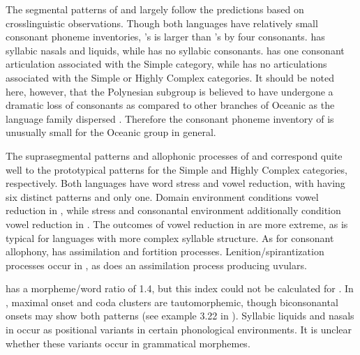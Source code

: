   The segmental patterns of  and  largely follow the predictions based on crosslinguistic observations. Though both languages have relatively small consonant phoneme inventories, ’s is larger than ’s by four consonants.  has syllabic nasals and liquids, while  has no syllabic consonants.  has one consonant articulation associated with the Simple category, while  has no articulations associated with the Simple or Highly Complex categories. It should be noted here, however, that the Polynesian subgroup is believed to have undergone a dramatic loss of consonants as compared to other branches of Oceanic as the language family dispersed \citep{Trudgill2004}. Therefore the consonant phoneme inventory of  is unusually small for the Oceanic group in general.

  The suprasegmental patterns and allophonic processes of  and  correspond quite well to the prototypical patterns for the Simple and Highly Complex categories, respectively. Both languages have word stress and vowel reduction, with  having six distinct patterns and  only one. Domain environment conditions vowel reduction in , while stress and consonantal environment additionally condition vowel reduction in . The outcomes of vowel reduction in  are more extreme, as is typical for languages with more complex syllable structure. As for consonant allophony,  has assimilation and fortition processes. Lenition/spirantization processes occur in , as does an assimilation process producing uvulars.

   has a morpheme/word ratio of 1.4, but this index could not be calculated for . In , maximal onset and coda clusters are tautomorphemic, though biconsonantal onsets may show both patterns (see example 3.22 in ). Syllabic liquids and nasals in  occur as positional variants in certain phonological environments. It is unclear whether these variants occur in grammatical morphemes.

